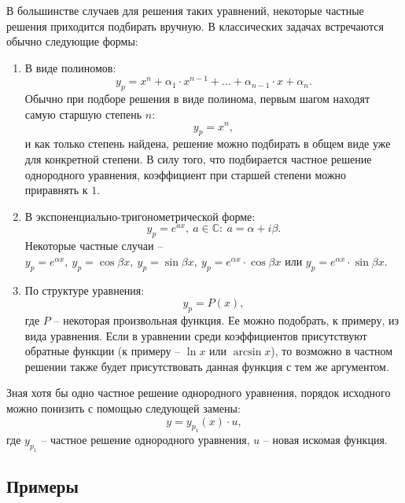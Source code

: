 	В большинстве случаев для решения таких уравнений, некоторые частные решения приходится подбирать вручную. В классических задачах встречаются обычно следующие формы:
	\begin{enumerate}
		\item В виде полиномов:
			\[ y_p = x^n + \alpha_1 \cdot x^{n-1} + \dots + \alpha_{n-1} \cdot x + \alpha_n. \]
			Обычно при подборе решения в виде полинома, первым шагом находят самую старшую степень $n$:
			\[ y_p = x^n, \]
			и как только степень найдена, решение можно подбирать в общем виде уже для конкретной степени. В силу того, что подбирается частное решение однородного уравнения, коэффициент при старшей степени можно приравнять к $1$.

		\item В экспоненциально-тригонометрической форме:
			\[ y_p = e^{a x}, ~ a \in \mathbb{C}: ~ a = \alpha + i \beta. \]
			Некоторые частные случаи -- \( y_p = e^{\alpha x}, ~ y_p = \cos{\beta x}, ~ y_p = \sin{\beta x}, ~ y_p = e^{\alpha x} \cdot \cos{\beta x} \) или $y_p = e^{\alpha x} \cdot \sin{\beta x}$.

		\item По структуре уравнения:
			\[ y_p = P(x), \]
			где $P$ -- некоторая произвольная функция. Ее можно подобрать, к примеру, из вида уравнения. Если в уравнении среди коэффициентов присутствуют обратные функции (к примеру -- $\ln{x}$ или $\arcsin{x}$), то возможно в частном решении также будет присутствовать данная функция с тем же аргументом.
	\end{enumerate}

	Зная хотя бы одно частное решение однородного уравнения, порядок исходного можно понизить с помощью следующей замены:
	\[ y = y_{p_1}(x) \cdot u, \]
	где $y_{p_1}$ -- частное решение однородного уравнения, $u$ -- новая искомая функция.

	\subsection{Примеры}

